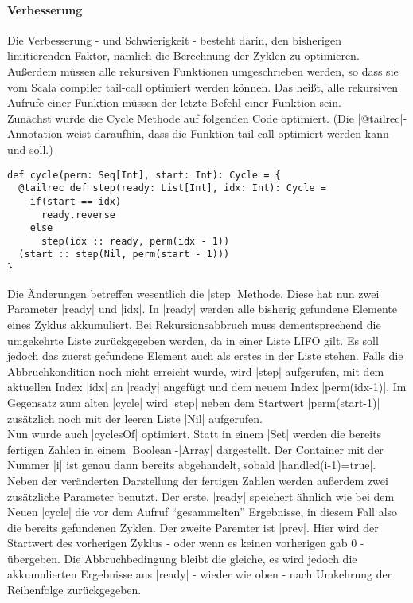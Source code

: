 \paragraph{Verbesserung}
\label{fast_cycler}
Die Verbesserung - und Schwierigkeit - besteht darin, den bisherigen limitierenden Faktor, nämlich die Berechnung der Zyklen zu optimieren.
Außerdem müssen alle rekursiven Funktionen umgeschrieben werden, so dass sie vom Scala compiler tail-call optimiert werden können.
Das heißt, alle rekursiven Aufrufe einer Funktion müssen der letzte Befehl einer Funktion sein. \\
Zunächst wurde die Cycle Methode auf folgenden Code optimiert. (Die |@tailrec|-Annotation weist daraufhin, dass die Funktion tail-call optimiert werden kann und soll.)
\begin{lstlisting}
def cycle(perm: Seq[Int], start: Int): Cycle = {
  @tailrec def step(ready: List[Int], idx: Int): Cycle =
    if(start == idx)
      ready.reverse
    else
      step(idx :: ready, perm(idx - 1))
  (start :: step(Nil, perm(start - 1)))
}
\end{lstlisting}
Die Änderungen betreffen wesentlich die |step| Methode. Diese hat nun zwei Parameter |ready| und |idx|.
In |ready| werden alle bisherig gefundene Elemente eines Zyklus akkumuliert.
Bei Rekursionsabbruch muss dementsprechend die umgekehrte Liste zurückgegeben werden, da in einer Liste LIFO gilt.
Es soll jedoch das zuerst gefundene Element auch als erstes in der Liste stehen.
Falls die Abbruchkondition noch nicht erreicht wurde, wird |step| aufgerufen, mit dem aktuellen Index |idx| an |ready| angefügt und dem neuem Index |perm(idx-1)|.
Im Gegensatz zum alten |cycle| wird |step| neben dem Startwert |perm(start-1)| zusätzlich noch mit der leeren Liste |Nil| aufgerufen.\\
Nun wurde auch |cyclesOf| optimiert. Statt in einem |Set| werden die bereits fertigen Zahlen in einem |Boolean|-|Array| dargestellt.
Der Container mit der Nummer |i| ist genau dann bereits abgehandelt, sobald |handled(i-1)=true|.
Neben der veränderten Darstellung der fertigen Zahlen werden außerdem zwei zusätzliche Parameter benutzt.
Der erste, |ready| speichert ähnlich wie bei dem Neuen |cycle| die vor dem Aufruf ``gesammelten'' Ergebnisse, in diesem Fall also die bereits gefundenen Zyklen.
Der zweite Paremter ist |prev|. Hier wird der Startwert des vorherigen Zyklus - oder wenn es keinen vorherigen gab 0 - übergeben.
Die Abbruchbedingung bleibt die gleiche, es wird jedoch die akkumulierten Ergebnisse aus |ready| - wieder wie oben - nach Umkehrung der Reihenfolge zurückgegeben.
